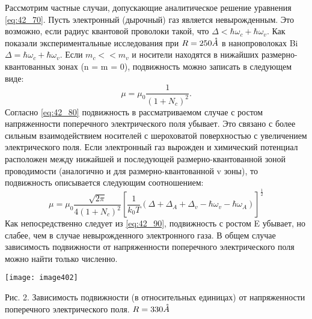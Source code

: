Рассмотрим частные случаи, допускающие аналитическое решение уравнения \eqref{eq:42_70}. Пусть электронный (дырочный) газ является невырожденным. Это возможно, если радиус квантовой проволоки такой, что $\Delta <\hbar \omega _{c} +\hbar \omega _{v} $. Как показали экспериментальные исследования \cite{Black2003a} при $R=250 \AA$ в нанопроволоках Bi $\Delta =\hbar \omega _{c} +\hbar \omega _{v} $. Если $m_{c} <<m_{v} $ и носители находятся в нижайших размерно-квантованных зонах (n = m = 0), подвижность можно записать в следующем виде:
\begin{equation} \label{eq:42_80}
\mu =\mu _{0} \frac{1}{\left(1+N_{c} \right)^{2} } .
\end{equation}
Согласно \eqref{eq:42_80} подвижность в рассматриваемом случае с ростом напряженности поперечного электрического поля убывает. Это связано с более сильным взаимодействием носителей с шероховатой поверхностью с увеличением электрического поля. Если электронный газ вырожден и химический потенциал расположен между нижайшей и последующей размерно-квантованной зоной проводимости (аналогично и для размерно-квантованной v зоны), то подвижность описывается следующим соотношением:
\begin{equation} \label{eq:42_90}
\mu =\mu _{0} \frac{\sqrt{2\pi } }{4\left(1+N_{c} \right)^{2} } \left[\frac{1}{k_{0} T} \left(\Delta +\Delta _{A} +\Delta _{v} -\hbar \omega _{v} -\hbar \omega _{A} \right)\right]^{\frac{1}{2} }
\end{equation} 
Как непосредственно следует из \eqref{eq:42_90}, подвижность с ростом E убывает, но слабее, чем в случае невырожденного электронного газа. В общем случае зависимость подвижности от напряженности поперечного электрического поля можно найти только численно.

\noindent \texttt{[image: image402]}

\noindent Рис. 2. Зависимость подвижности (в относительных единицах) от напряженности поперечного электрического поля. $R=330 \AA$

